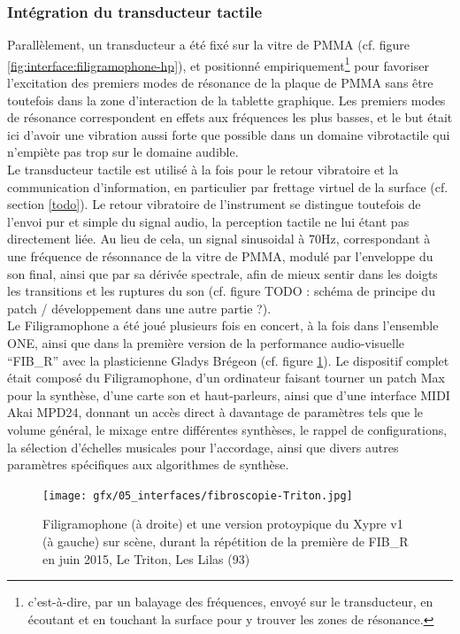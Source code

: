 \subsubsection{Intégration du transducteur tactile}

\noindent Parallèlement, un transducteur a été fixé sur la vitre de \gls{PMMA} (cf. figure \ref{fig:interface:filigramophone-hp}), et positionné empiriquement\footnote{c'est-à-dire, par un balayage des fréquences, envoyé sur le transducteur, en écoutant et en touchant la surface pour y trouver les zones de résonance.} pour favoriser l'excitation des premiers modes de résonance de la plaque de \gls{PMMA} sans être toutefois dans la zone d'interaction de la tablette graphique. Les premiers modes de résonance correspondent en effets aux fréquences les plus basses, et le but était ici d'avoir une vibration aussi forte que possible dans un domaine vibrotactile qui n'empiète pas trop sur le domaine audible.\\
\indent Le transducteur tactile est utilisé à la fois pour le retour vibratoire et la communication d'information, en particulier par frettage virtuel de la surface (cf. section \ref{todo}). Le retour vibratoire de l'instrument se distingue toutefois de l'envoi pur et simple du signal audio, la perception tactile ne lui étant pas directement liée. Au lieu de cela, un signal sinusoidal à 70Hz, correspondant à une fréquence de résonnance de la vitre de \gls{PMMA}, modulé par l'enveloppe du son final, ainsi que par sa dérivée spectrale, afin de mieux sentir dans les doigts les transitions et les ruptures du son (cf. figure TODO : schéma de principe du patch / développement dans une autre partie ?).\\
\indent Le Filigramophone a été joué plusieurs fois en concert, à la fois dans l'ensemble ONE, ainsi que dans la première version de la performance audio-visuelle ``FIB\_R'' avec la plasticienne Gladys Brégeon (cf. figure \ref{fig:interface:filigramophone-Xypre-Triton}). Le dispositif complet était composé du Filigramophone, d'un ordinateur faisant tourner un patch Max pour la synthèse, d'une carte son et haut-parleurs, ainsi que d'une interface \gls{MIDI} Akai MPD24, donnant un accès direct à davantage de paramètres tels que le volume général, le mixage entre différentes synthèses, le rappel de configurations, la sélection d'échelles musicales pour l'accordage, ainsi que divers autres paramètres spécifiques aux algorithmes de synthèse.

\begin{figure}[!htbp]
	\captionsetup{format=plain}%
	\texttt{[image: gfx/05\_interfaces/fibroscopie-Triton.jpg]}
	\caption{Filigramophone (à droite) et une version protoypique du Xypre v1 (à gauche) sur scène, durant la répétition de la première de FIB\_R en juin 2015, Le Triton, Les Lilas (93)}
	\label{fig:interface:filigramophone-Xypre-Triton}
\end{figure}



